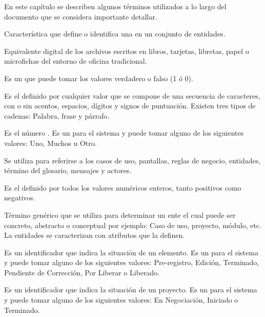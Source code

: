 \label{sec:glosario}
    En este capítulo se describen algunos términos utilizados a lo largo del documento que se considera importante detallar. 
  
\begin{description}
	 Característica que define o identifica una  en un conjunto de entidades.

	 Equivalente digital de los archivos escritos en libros, tarjetas, libretas, papel o microfichas del entorno de oficina tradicional.

	 Es un  que puede tomar los valores verdadero o falso (1 ó 0).
	
	 Es el  definido por cualquier valor que se compone de una secuencia de caracteres, con o sin acentos, espacios, dígitos y 
	signos de puntuación. Existen tres tipos de cadenas: Palabra, frase y párrafo.
	
	 Es el número . Es un  para el sistema y puede tomar alguno de los siguientes valores:
	Uno, Muchos u Otro.

	 Se utiliza para referirse a los casos de uso, pantallas, reglas de negocio, entidades, término del glosario, mensajes y actores.
	
	 Es el   definido por todos los valores numéricos enteros, tanto positivos como negativos.
	
	 Término genérico que se utiliza para determinar un ente el cual puede ser concreto, abstracto o conceptual por ejemplo: Caso de uso, 
		proyecto, módulo, etc. La entidades se caracterizan con atributos que la definen.		
		
	 Es un identificador que indica la situación de un elemento. Es un  para el sistema y puede tomar alguno de los siguientes valores:
	Pre-registro, Edición, Terminado, Pendiente de Corrección, Por Liberar o Liberado.
	
	 Es un identificador que indica la situación de un proyecto. Es un  para el sistema y puede tomar alguno de los siguientes valores:
	En Negociación, Iniciado o Terminado.


\end{description}
